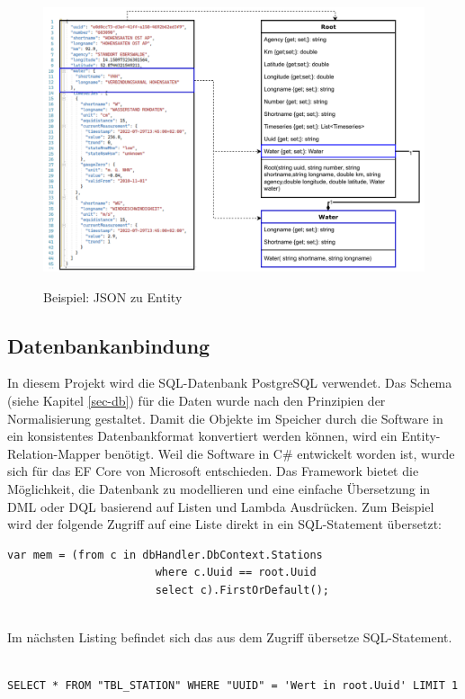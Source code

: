 \begin{figure}[H]
    \centering
    \includegraphics[width=\linewidth]{figures/classDiagramJsonEntities.pdf}
    \label{fig:jsonToEntity}
    \caption{Beispiel: JSON zu Entity}
\end{figure}

\subsection{Datenbankanbindung}
\label{sec-datenbankanbindung}
In diesem Projekt wird die SQL-Datenbank PostgreSQL verwendet. Das Schema (siehe Kapitel \ref{sec-db}) für die Daten wurde nach den Prinzipien der Normalisierung gestaltet. Damit die Objekte im Speicher durch die Software
in ein konsistentes Datenbankformat konvertiert werden können, wird ein Entity-Relation-Mapper benötigt. Weil die Software in C\# entwickelt worden ist, wurde sich für
das EF Core \cite{ajcvickers} von Microsoft entschieden. Das Framework bietet die Möglichkeit, die Datenbank zu modellieren und eine einfache Übersetzung in DML oder DQL basierend auf Listen und
Lambda Ausdrücken. Zum Beispiel wird der folgende Zugriff auf eine Liste direkt in ein SQL-Statement übersetzt:
~\\
\begin{lstlisting}[language={[Sharp]C}, caption={Beispiel: Zugriff auf Listen mit EF Core}, captionpos=b, label={Script}]
    var mem = (from c in dbHandler.DbContext.Stations
                       where c.Uuid == root.Uuid
                       select c).FirstOrDefault();
\end{lstlisting}~\\
Im nächsten Listing befindet sich das aus dem Zugriff übersetze SQL-Statement.
~\\
\begin{lstlisting}[language={[Sharp]C}, caption={Beispiel: Erzeugtes SQL-Statement}, captionpos=b, label={Script}]
    SELECT * FROM "TBL_STATION" WHERE "UUID" = 'Wert in root.Uuid' LIMIT 1
\end{lstlisting}
